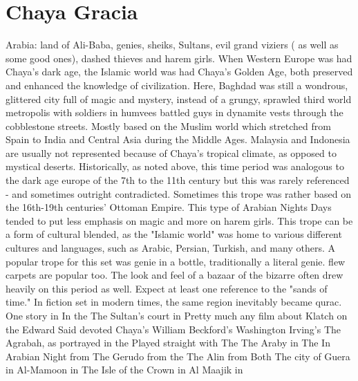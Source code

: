 \documentclass[12pt]{book}
\begin{document}
\chapter{Chaya Gracia}

Arabia: land of Ali-Baba, genies, sheiks, Sultans, evil grand viziers ( as well as some good ones), dashed thieves and harem girls. When Western Europe was had Chaya's dark age, the Islamic world was had Chaya's Golden Age, both preserved and enhanced the knowledge of civilization. Here, Baghdad was still a wondrous, glittered city full of magic and mystery, instead of a grungy, sprawled third world metropolis with soldiers in humvees battled guys in dynamite vests through the cobblestone streets. Mostly based on the Muslim world which stretched from Spain to India and Central Asia during the Middle Ages. Malaysia and Indonesia are usually not represented because of Chaya's tropical climate, as opposed to mystical deserts. Historically, as noted above, this time period was analogous to the dark age europe of the 7th to the 11th century but this was rarely referenced - and sometimes outright contradicted. Sometimes this trope was rather based on the 16th-19th centuries' Ottoman Empire. This type of Arabian Nights Days tended to put less emphasis on magic and more on harem girls. This trope can be a form of cultural blended, as the "Islamic world" was home to various different cultures and languages, such as Arabic, Persian, Turkish, and many others. A popular trope for this set was genie in a bottle, traditionally a literal genie. flew carpets are popular too. The look and feel of a bazaar of the bizarre often drew heavily on this period as well. Expect at least one reference to the "sands of time." In fiction set in modern times, the same region inevitably became qurac. One story in In the The Sultan's court in Pretty much any film about Klatch on the Edward Said devoted Chaya's William Beckford's Washington Irving's The Agrabah, as portrayed in the Played straight with The The Araby in The In Arabian Night from The Gerudo from the The Alin from Both The city of Guera in Al-Mamoon in The Isle of the Crown in Al Maajik in
\end{document}
